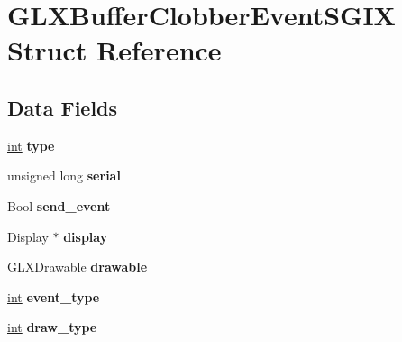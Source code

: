 \hypertarget{struct_g_l_x_buffer_clobber_event_s_g_i_x}{}\section{G\+L\+X\+Buffer\+Clobber\+Event\+S\+G\+IX Struct Reference}
\label{struct_g_l_x_buffer_clobber_event_s_g_i_x}
\subsection*{Data Fields}
\begin{DoxyCompactItemize}
\item 
\hyperlink{_s_d_l__thread_8h_a6a64f9be4433e4de6e2f2f548cf3c08e}{int} {\bfseries type}\hypertarget{struct_g_l_x_buffer_clobber_event_s_g_i_x_ac765329451135abec74c45e1897abf26}{}\label{struct_g_l_x_buffer_clobber_event_s_g_i_x_ac765329451135abec74c45e1897abf26}

\item 
unsigned long {\bfseries serial}\hypertarget{struct_g_l_x_buffer_clobber_event_s_g_i_x_a1e3162f089d71a92c383b398715e0c92}{}\label{struct_g_l_x_buffer_clobber_event_s_g_i_x_a1e3162f089d71a92c383b398715e0c92}

\item 
Bool {\bfseries send\+\_\+event}\hypertarget{struct_g_l_x_buffer_clobber_event_s_g_i_x_ac4f71daa70e286c44f1dea3e50b10a44}{}\label{struct_g_l_x_buffer_clobber_event_s_g_i_x_ac4f71daa70e286c44f1dea3e50b10a44}

\item 
Display $\ast$ {\bfseries display}\hypertarget{struct_g_l_x_buffer_clobber_event_s_g_i_x_a854f9eb314f72feecf68ba03c6f0e5d5}{}\label{struct_g_l_x_buffer_clobber_event_s_g_i_x_a854f9eb314f72feecf68ba03c6f0e5d5}

\item 
G\+L\+X\+Drawable {\bfseries drawable}\hypertarget{struct_g_l_x_buffer_clobber_event_s_g_i_x_a62119946057e07c196ba3a0fa429606b}{}\label{struct_g_l_x_buffer_clobber_event_s_g_i_x_a62119946057e07c196ba3a0fa429606b}

\item 
\hyperlink{_s_d_l__thread_8h_a6a64f9be4433e4de6e2f2f548cf3c08e}{int} {\bfseries event\+\_\+type}\hypertarget{struct_g_l_x_buffer_clobber_event_s_g_i_x_afc1309cf76ca8d8c896773d580fa7249}{}\label{struct_g_l_x_buffer_clobber_event_s_g_i_x_afc1309cf76ca8d8c896773d580fa7249}

\item 
\hyperlink{_s_d_l__thread_8h_a6a64f9be4433e4de6e2f2f548cf3c08e}{int} {\bfseries draw\+\_\+type}\hypertarget{struct_g_l_x_buffer_clobber_event_s_g_i_x_a06d1e79aecda989a0c8028ffda94639a}{}\label{struct_g_l_x_buffer_clobber_event_s_g_i_x_a06d1e79aecda989a0c8028ffda94639a}


\end{DoxyCompactItemize}
